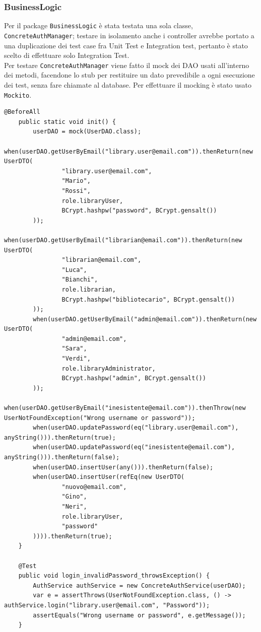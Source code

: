 \subsubsection{BusinessLogic}
Per il package \texttt{BusinessLogic} è stata testata una sola classe, \texttt{ConcreteAuthManager}; testare in isolamento anche i controller avrebbe portato a una duplicazione dei test case fra Unit Test e Integration test, pertanto è stato scelto di effettuare solo Integration Test.\\
Per testare \texttt{ConcreteAuthManager} viene fatto il mock dei DAO usati all'interno dei metodi, facendone lo stub per restituire un dato prevedibile a ogni esecuzione dei test, senza fare chiamate al database. Per effettuare il mocking è stato usato \texttt{Mockito}. 
\begin{code}
\begin{verbatim}
@BeforeAll
    public static void init() {
        userDAO = mock(UserDAO.class);
        when(userDAO.getUserByEmail("library.user@email.com")).thenReturn(new UserDTO(
                "library.user@email.com",
                "Mario",
                "Rossi",
                role.libraryUser,
                BCrypt.hashpw("password", BCrypt.gensalt())
        ));
        when(userDAO.getUserByEmail("librarian@email.com")).thenReturn(new UserDTO(
                "librarian@email.com",
                "Luca",
                "Bianchi",
                role.librarian,
                BCrypt.hashpw("bibliotecario", BCrypt.gensalt())
        ));
        when(userDAO.getUserByEmail("admin@email.com")).thenReturn(new UserDTO(
                "admin@email.com",
                "Sara",
                "Verdi",
                role.libraryAdministrator,
                BCrypt.hashpw("admin", BCrypt.gensalt())
        ));
        when(userDAO.getUserByEmail("inesistente@email.com")).thenThrow(new UserNotFoundException("Wrong username or password"));
        when(userDAO.updatePassword(eq("library.user@email.com"), anyString())).thenReturn(true);
        when(userDAO.updatePassword(eq("inesistente@email.com"), anyString())).thenReturn(false);
        when(userDAO.insertUser(any())).thenReturn(false);
        when(userDAO.insertUser(refEq(new UserDTO(
                "nuovo@email.com",
                "Gino",
                "Neri",
                role.libraryUser,
                "password"
        )))).thenReturn(true);
    }
    
    @Test
    public void login_invalidPassword_throwsException() {
        AuthService authService = new ConcreteAuthService(userDAO);
        var e = assertThrows(UserNotFoundException.class, () -> authService.login("library.user@email.com", "Password"));
        assertEquals("Wrong username or password", e.getMessage());
    }
\end{verbatim}
\caption{init e test case in AuthUnitTest}
\label{code:AuthUnitTest}
\end{code}
